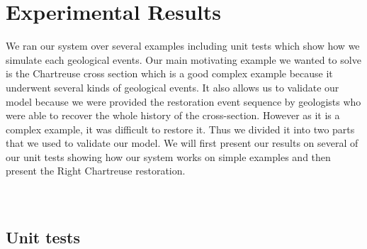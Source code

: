 \documentclass[12pt, a4paper]{report} %
\begin{document}
\chapter{Experimental Results}
We ran our system over several examples including unit tests which show how we simulate each geological events.
Our main motivating example we wanted to solve is the Chartreuse cross section which is a good complex example because it underwent several kinds of geological events. It also allows us to validate our model because we were provided the restoration event sequence by geologists who were able to recover the whole history of the cross-section. However as it is a complex example, it was difficult to restore it. Thus we divided it into two parts that we used to validate our model.
We will first present our results on several of our unit tests showing how our system works on simple examples and then present the Right Chartreuse restoration.\\\\\
\section{Unit tests}
\end{document}

